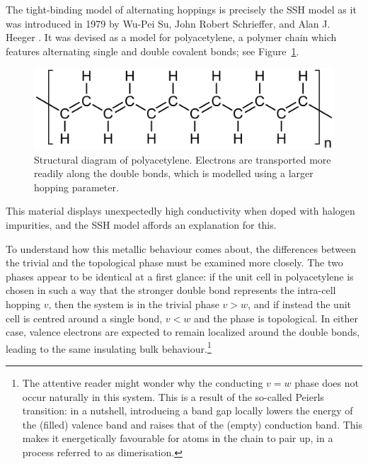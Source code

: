 The tight-binding model of alternating hoppings is precisely the SSH model as it was introduced in 1979 by Wu-Pei Su, John Robert Schrieffer, and Alan J. Heeger \cite{SSH_model,SSH_model2}. It was devised as a model for polyacetylene, a polymer chain which features alternating single and double covalent bonds; see Figure~\ref{fig:polyacetylene}.
\begin{figure}[htb!]
	\centering
	\includegraphics[width=.8\linewidth]{Images/polyacetylene}
	\caption{Structural diagram of polyacetylene. Electrons are transported more readily along the double bonds, which is modelled using a larger hopping parameter.}
	\label{fig:polyacetylene}
\end{figure}
This material displays unexpectedly high conductivity when doped with halogen impurities, and the SSH model affords an explanation for this.

To understand how this metallic behaviour comes about, the differences between the trivial and the topological phase must be examined more closely. The two phases appear to be identical at a first glance: if the unit cell in polyacetylene is chosen in such a way that the stronger double bond represents the intra-cell hopping $v$, then the system is in the trivial phase $v>w$, and if instead the unit cell is centred around a single bond, $v<w$ and the phase is topological. In either case, valence electrons are expected to remain localized around the double bonds, leading to the same insulating bulk behaviour.\footnote{
	The attentive reader might wonder why the conducting $v=w$ phase does not occur naturally in this system. This is a result of the so-called Peierls transition: in a nutshell, introducing a band gap locally lowers the energy of the (filled) valence band and raises that of the (empty) conduction band. This makes it energetically favourable for atoms in the chain to pair up, in a process referred to as dimerisation.}

